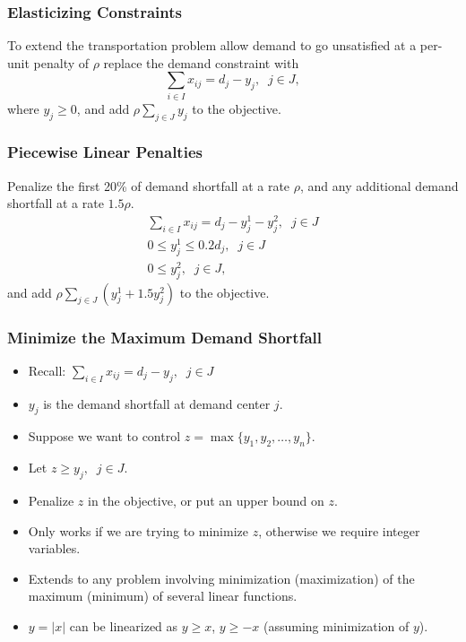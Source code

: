 \documentclass[12pt,handout]{beamer}
\begin{document}
\begin{frame}
\frametitle{Elasticizing Constraints}
To extend the transportation problem allow demand to go unsatisfied at a per-unit penalty of $\rho$ replace the demand constraint with
\begin{equation}
\sum_{i \in I} x_{ij} = d_j - y_j,\;\;j \in J, \nonumber
\end{equation}
\noindent where $y_j \ge 0$, and add $\rho \sum_{j \in J} y_j$ to the objective.
\end{frame}

\begin{frame}
\frametitle{Piecewise Linear Penalties}
Penalize the first 20\% of demand shortfall at a rate $\rho$, and any additional demand shortfall at a rate $1.5\rho$.
\begin{eqnarray}
\sum_{i \in I} x_{ij} = d_j - y_j^1 - y_j^2,\;\;j \in J \nonumber \\
0 \le y_j^1 \le 0.2d_j,\;\;j \in J \nonumber \\
0 \le y_j^2,\;\;j \in J, \nonumber
\end{eqnarray}
\noindent and add $\rho \sum_{j \in J} (y_j^1 + 1.5 y_j^2)$ to the objective.
\end{frame}

\begin{frame}
\frametitle{Minimize the Maximum Demand Shortfall}
\begin{itemize}
\item Recall: $\sum_{i \in I} x_{ij} = d_j - y_j,\;\;j \in J$
\item $y_j$ is the demand shortfall at demand center $j$.
\item Suppose we want to control $z = \max \{y_1, y_2, \ldots, y_n\}$.
\item Let $z \ge y_j,\;\;j \in J$.
\item Penalize $z$ in the objective, or put an upper bound on $z$.
\item Only works if we are trying to minimize $z$, otherwise we require integer variables.
\item Extends to any problem involving minimization (maximization) of the maximum (minimum) of several linear functions.
\item $y = |x|$ can be linearized as $y \ge x$, $y \ge -x$ (assuming minimization of $y$).
\end{itemize}
\end{frame}
\end{document}

